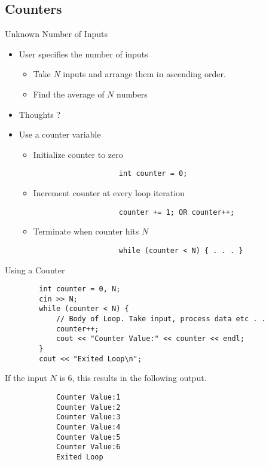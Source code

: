 \subsection{Counters}

\begin{frame}[fragile]{Unknown Number of Inputs}{}
    \begin{itemize}
        \item User specifies the number of inputs
        \begin{itemize}
            \item Take $N$ inputs and arrange them in ascending order.
            \item Find the average of $N$ numbers
        \end{itemize}
        \item Thoughts ?
        \item Use a counter variable
        \begin{itemize}
            \item Initialize counter to zero
                \begin{verbatim}
                    int counter = 0;
                \end{verbatim}
            \item Increment counter at every loop iteration
                \begin{verbatim}
                    counter += 1; OR counter++;
                \end{verbatim}
            \item Terminate when counter hits $N$
                \begin{verbatim}
                    while (counter < N) { . . . }
                \end{verbatim}
        \end{itemize}
    \end{itemize}
\end{frame}

\begin{frame}[fragile]{Using a Counter}{}
    \begin{verbatim}
        int counter = 0, N;
        cin >> N;
        while (counter < N) {
            // Body of Loop. Take input, process data etc . .
            counter++;
            cout << "Counter Value:" << counter << endl;
        }
        cout << "Exited Loop\n";
    \end{verbatim}
    \pause
    \begin{block}{If the input $N$ is 6, this results in the following output.}
        \begin{verbatim}
            Counter Value:1
            Counter Value:2
            Counter Value:3
            Counter Value:4
            Counter Value:5
            Counter Value:6
            Exited Loop
        \end{verbatim}
    \end{block}
\end{frame}
